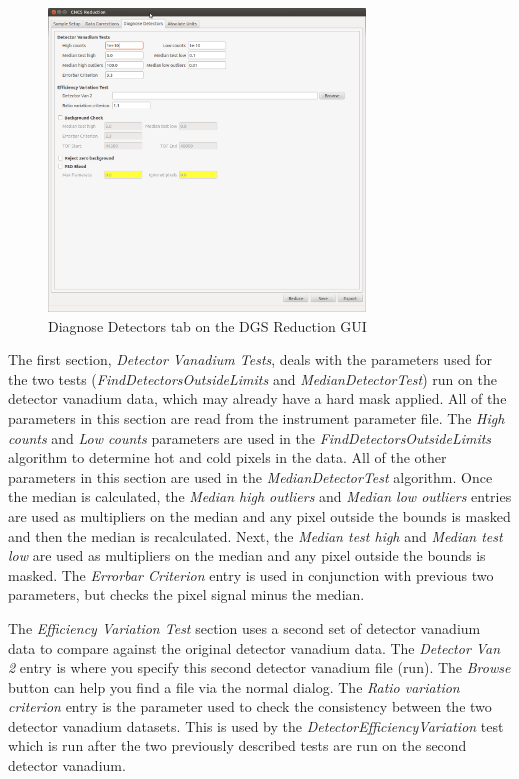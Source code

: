 \begin{figure}[ht]
\centerline{\includegraphics[width=0.75\textwidth]{figures/DiagnoseDetectors.png}}
\caption{Diagnose Detectors tab on the DGS Reduction GUI}
\label{fig:DiagDet}
\end{figure}

The first section, \textit{Detector Vanadium Tests}, deals with the parameters used for the two tests (\textit{FindDetectorsOutsideLimits} and \textit{MedianDetectorTest}) run on the detector vanadium data, which may already have a hard mask applied. All of the parameters in this section are read from the instrument parameter file. The \textit{High counts} and \textit{Low counts} parameters are used in the \textit{FindDetectorsOutsideLimits} algorithm to determine hot and cold pixels in the data. All of the other parameters in this section are used in the \textit{MedianDetectorTest} algorithm. Once the median is calculated, the \textit{Median high outliers} and \textit{Median low outliers} entries are used as multipliers on the median and any pixel outside the bounds is masked and then the median is recalculated. Next, the \textit{Median test high} and \textit{Median test low} are used as multipliers on the median and any pixel outside the bounds is masked. The \textit{Errorbar Criterion} entry is used in conjunction with previous two parameters, but checks the pixel signal minus the median.

The \textit{Efficiency Variation Test} section uses a second set of detector vanadium data to compare against the original detector vanadium data. The \textit{Detector Van 2} entry is where you specify this second detector vanadium file (run). The \textit{Browse} button can help you find a file via the normal dialog. The \textit{Ratio variation criterion} entry is the parameter used to check the consistency between the two detector vanadium datasets. This is used by the \textit{DetectorEfficiencyVariation} test which is run after the two previously described tests are run on the second detector vanadium.

